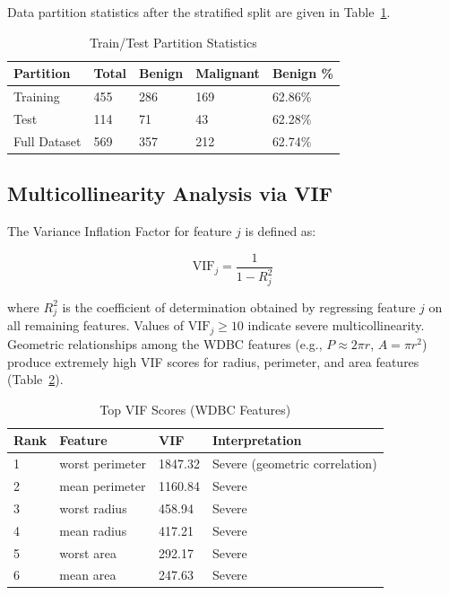 \documentclass[10pt,letterpaper]{article}
\begin{document}
Data partition statistics after the stratified split are given in Table~\ref{tab:splits}.

\begin{table}[h]
\centering
\caption{Train/Test Partition Statistics}
\label{tab:splits}
\begin{tabular}{lllll}
\toprule
\textbf{Partition} & \textbf{Total} & \textbf{Benign} & \textbf{Malignant} & \textbf{Benign \%} \\
\midrule
Training & 455 & 286 & 169 & 62.86\% \\
Test     & 114 & 71  & 43  & 62.28\% \\
Full Dataset & 569 & 357 & 212 & 62.74\% \\
\bottomrule
\end{tabular}
\end{table}

\subsection{Multicollinearity Analysis via VIF}

The Variance Inflation Factor for feature $j$ is defined as:

\begin{equation}
    \text{VIF}_j = \frac{1}{1 - R_j^2}
    \label{eq:vif}
\end{equation}

where $R_j^2$ is the coefficient of determination obtained by regressing feature $j$ on all
remaining features. Values of $\text{VIF}_j \geq 10$ indicate severe multicollinearity.
Geometric relationships among the WDBC features (e.g., $P \approx 2\pi r$, $A = \pi r^2$)
produce extremely high VIF scores for radius, perimeter, and area features (Table~\ref{tab:vif}).

\begin{table}[h]
\centering
\caption{Top VIF Scores (WDBC Features)}
\label{tab:vif}
\begin{tabular}{llll}
\toprule
\textbf{Rank} & \textbf{Feature} & \textbf{VIF} & \textbf{Interpretation} \\
\midrule
1 & worst perimeter & 1847.32 & Severe (geometric correlation) \\
2 & mean perimeter  & 1160.84 & Severe \\
3 & worst radius    & 458.94  & Severe \\
4 & mean radius     & 417.21  & Severe \\
5 & worst area      & 292.17  & Severe \\
6 & mean area       & 247.63  & Severe \\
\bottomrule
\end{tabular}
\end{table}
\end{document}
